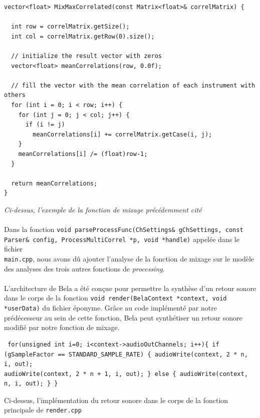 \begin{lstlisting}
vector<float> MixMaxCorrelated(const Matrix<float>& correlMatrix) {

  int row = correlMatrix.getSize();
  int col = correlMatrix.getRow(0).size();

  // initialize the result vector with zeros
  vector<float> meanCorrelations(row, 0.0f);

  // fill the vector with the mean correlation of each instrument with others
  for (int i = 0; i < row; i++) {
    for (int j = 0; j < col; j++) {
      if (i != j)
        meanCorrelations[i] += correlMatrix.getCase(i, j);
    }
    meanCorrelations[i] /= (float)row-1;
  }

  return meanCorrelations;
}
\end{lstlisting}

\begin{center}
 \textit{Ci-dessus, l'exemple de la fonction de mixage précédemment cité}
\end{center}

\paragraph{}
Dans la fonction
\verb!void parseProcessFunc(ChSettings& gChSettings, const!
\\ \verb!Parser& config, ProcessMultiCorrel *p, void *handle)!
appelée dans le fichier \\ \verb!main.cpp!, nous avons dû ajouter
l'analyse de la fonction de mixage sur le modèle des analyses des
trois autres fonctions de \textit{processing}.

\paragraph{}
L'architecture de Bela a été conçue pour permettre la synthèse d'un
retour sonore dans le corps de la fonction
\verb!void render(BelaContext *context, void *userData)! du fichier
éponyme. Grâce au code implémenté par notre prédécesseur au sein de
cette fonction, Bela peut synthétiser un retour sonore modifié par
notre fonction de mixage.

\begin{lstlisting} for(unsigned int i=0; i<context->audioOutChannels; i++){ if
(gSampleFactor == STANDARD_SAMPLE_RATE) { audioWrite(context, 2 * n, i, out);
audioWrite(context, 2 * n + 1, i, out); } else { audioWrite(context, n, i, out); } }
\end{lstlisting} \begin{center} Ci-dessus, l'implémentation du retour sonore
dans le corps de la fonction principale de \verb!render.cpp! \end{center}

